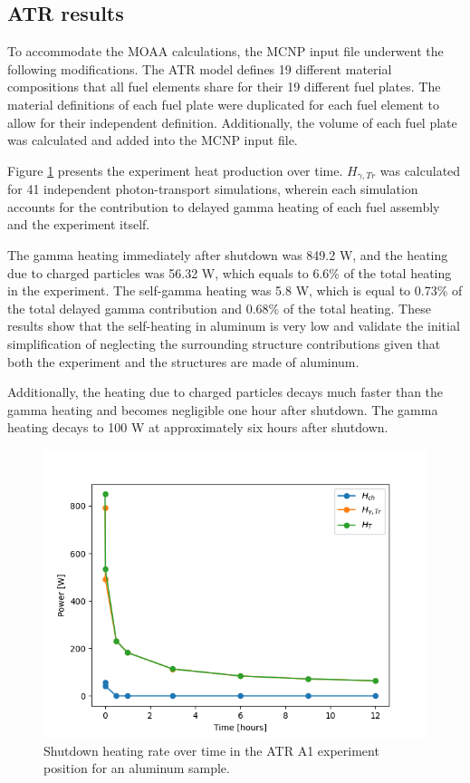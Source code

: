 \subsection{ATR results}

To accommodate the MOAA calculations, the MCNP input file underwent the following modifications.
The ATR model defines 19 different material compositions that all fuel elements share for their 19 different fuel plates.
The material definitions of each fuel plate were duplicated for each fuel element to allow for their independent definition.
Additionally, the volume of each fuel plate was calculated and added into the MCNP input file.

Figure \ref{fig:atr-time} presents the experiment heat production over time.
$H_{\gamma,Tr}$ was calculated for 41 independent photon-transport simulations, wherein each simulation accounts for the contribution to delayed gamma heating of each fuel assembly and the experiment itself.

The gamma heating immediately after shutdown was 849.2 W, and the heating due to charged particles was 56.32 W, which equals to 6.6\% of the total heating in the experiment.
The self-gamma heating was 5.8 W, which is equal to 0.73\% of the total delayed gamma contribution and 0.68\% of the total heating.
These results show that the self-heating in aluminum is very low and validate the initial simplification of neglecting the surrounding structure contributions given that both the experiment and the structures are made of aluminum.

Additionally, the heating due to charged particles decays much faster than the gamma heating and becomes negligible one hour after shutdown.
The gamma heating decays to 100 W at approximately six hours after shutdown.

\begin{figure}[htbp!] %
    \centering
    \includegraphics[width=0.65\linewidth]{figures/atr-decay-heat-time}
    \hfill
    \caption{Shutdown heating rate over time in the ATR A1 experiment position for an aluminum sample.}
    \label{fig:atr-time}
\end{figure}

